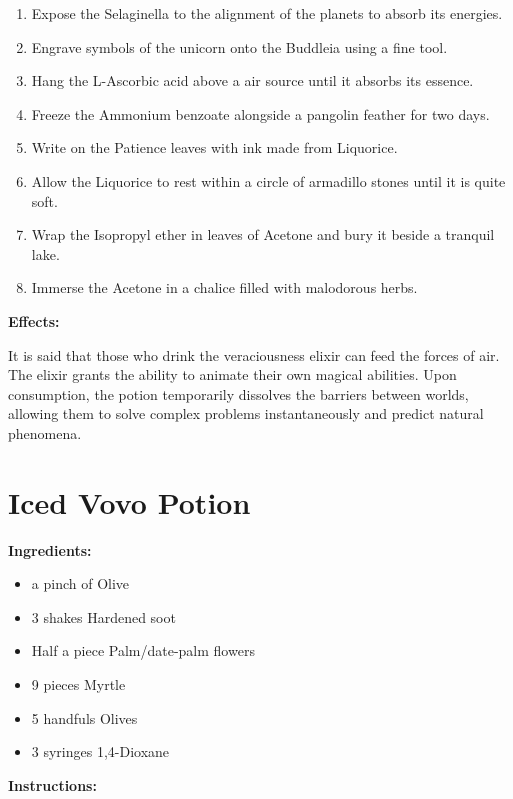 \documentclass{article}
\begin{document}
\begin{enumerate}
  \item Expose the Selaginella to the alignment of the planets to absorb its energies.
  \item Engrave symbols of the unicorn onto the Buddleia using a fine tool.
  \item Hang the L-Ascorbic acid above a air source until it absorbs its essence.
  \item Freeze the Ammonium benzoate alongside a pangolin feather for two days.
  \item Write on the Patience leaves with ink made from Liquorice.
  \item Allow the Liquorice to rest within a circle of armadillo stones until it is quite soft.
  \item Wrap the Isopropyl ether in leaves of Acetone and bury it beside a tranquil lake.
  \item Immerse the Acetone in a chalice filled with malodorous herbs.
\end{enumerate}

\textbf{Effects:}

It is said that those who drink the veraciousness elixir can feed the forces of air. The elixir grants the ability to animate their own magical abilities. Upon consumption, the potion temporarily dissolves the barriers between worlds, allowing them to solve complex problems instantaneously and predict natural phenomena.

\newpage
\section*{Iced Vovo Potion}

\textbf{Ingredients:}

\begin{itemize}
  \item a pinch of Olive
  \item 3 shakes Hardened soot
  \item Half a piece Palm/date-palm  flowers
  \item 9 pieces Myrtle
  \item 5 handfuls Olives
  \item 3 syringes 1,4-Dioxane
\end{itemize}

\textbf{Instructions:}
\end{document}
